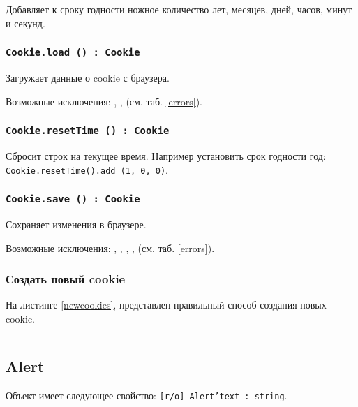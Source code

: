Добавляет к сроку годности ножное количество лет, месяцев, дней, часов, минут и секунд.

\subsubsection{\texttt{Cookie.load () : Cookie}}

Загружает данные о cookie с браузера.

Возможные исключения: , ,  (см. таб. \ref{errors}).

\subsubsection{\texttt{Cookie.resetTime () : Cookie}}

Сбросит строк на текущее время. Например установить срок годности год: \texttt{Cookie.resetTime().add (1, 0, 0)}.

\subsubsection{\texttt{Cookie.save () : Cookie}}

Сохраняет изменения в браузере.

Возможные исключения: , , , ,  (см. таб. \ref{errors}).

\subsubsection{Создать новый cookie}

На листинге \ref{newcookies}, представлен правильный способ создания новых cookie.

\begin{sourcecode}
	\label{newcookies}
    \inputminted[linenos]{icl}{../sources/newcookies.icL}
\end{sourcecode}


\subsection{{\color{orange} Alert}}

Объект \alert{} имеет следующее свойство: \texttt{[r/o] Alert'text : string}.

